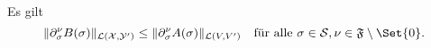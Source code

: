 \begin{Lemma}
\label{lemma:norm_B_beschraenkt_durch_norm_A}
    Es gilt
    \begin{equation}
        \norm{\partial^{\nu}_{\sigma} B(\sigma)}_{\mathcal L(\mathcal X, \mathcal Y')}
        \leq
        \norm{\partial^{\nu}_{\sigma} A(\sigma)}_{\mathcal L(V, V')}
        \quad
        \text{für alle}~\sigma \in \mathcal S, \nu \in \mathfrak F \setminus \Set{ 0 }.
    \end{equation}

\end{Lemma}



